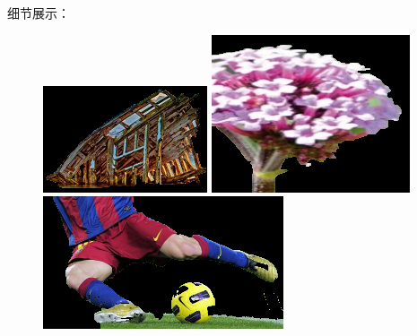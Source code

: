 \documentclass[lang=cn,11pt,a4paper]{elegantpaper}
\begin{document}
细节展示：

\begin{figure}[ht]
	\centering
	\begin{minipage}{0.3\linewidth}
		\centering
		\includegraphics[width=0.98\linewidth]{image/result_boat_details.png}
	\end{minipage}
	\begin{minipage}{0.3\linewidth}
		\centering
		\includegraphics[width=0.98\linewidth]{image/result_flower_details.png}
	\end{minipage}
	\begin{minipage}{0.3\linewidth}
		\centering
		\includegraphics[width=0.98\linewidth]{image/result_messi_details.png}
	\end{minipage}
\end{figure}
\end{document}
